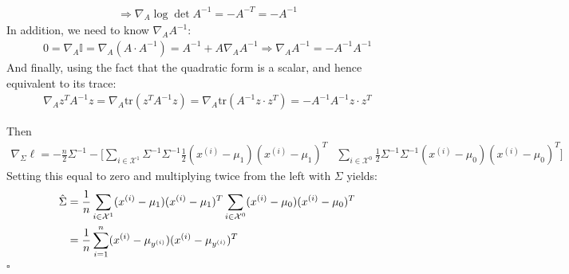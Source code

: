 \begin{answer}
\begin{align*}
    \Rightarrow \nabla_A\log\det A^{-1} = - A^{-T} = -A^{-1}
\end{align*}
In addition, we need to know $\nabla_A A^{-1}$:
\begin{align*}
    0 = \nabla_A \mathbb{I} = \nabla_A (A\cdot A^{-1}) =  A^{-1} + A \nabla_A A^{-1} \Rightarrow \nabla_A A^{-1} = - A^{-1} A^{-1}
\end{align*}
And finally, using the fact that the quadratic form is a scalar, and hence equivalent to its trace:
\begin{align*}
    \nabla_A z^T A^{-1} z = \nabla_A\mathrm{tr}(z^T A^{-1} z) = \nabla_A\mathrm{tr}(A^{-1} z\cdot z^T) =  - A^{-1} A^{-1} z\cdot z^T
\end{align*}

Then
\begin{align*}
    \nabla_\Sigma\ell = -\frac{n}{2}\Sigma^{-1} - \biggl[ \sum_{i\in\mathcal{X}^1} \Sigma^{-1}\Sigma^{-1} \frac{1}{2}(x^{(i)}-\mu_{1}) (x^{(i)}-\mu_{1})^T
    & \sum_{i\in\mathcal{X}^0} \frac{1}{2}\Sigma^{-1}\Sigma^{-1} (x^{(i)}-\mu_{0}) (x^{(i)}-\mu_{0})^T  \biggr]
\end{align*}
Setting this equal to zero and multiplying twice from the left with $\Sigma$ yields:
\begin{align*}
    \hat{\Sigma} &= \frac{1}{n}\sum_{i\in\mathcal{X}^1} (x^{(i)}-\mu_{1}) (x^{(i)}-\mu_{1})^T
     \sum_{i\in\mathcal{X}^0} (x^{(i)}-\mu_{0}) (x^{(i)}-\mu_{0})^T \\
     &= \frac{1}{{n}} \sum_{i=1}^{n} (x^{(i)} - \mu_{y^{(i)}}) (x^{(i)} -
     \mu_{y^{(i)}})^T
\end{align*}
\hfill\ensuremath{\square}
\end{answer}
